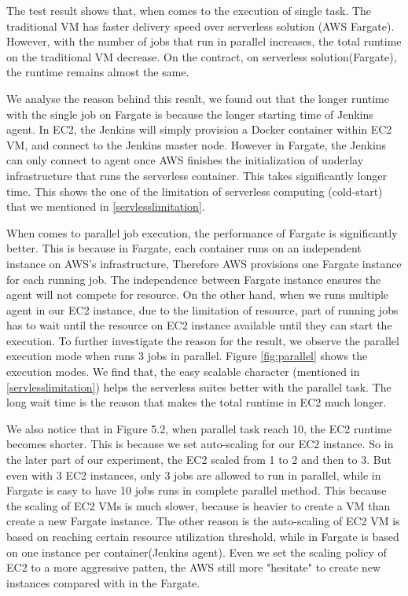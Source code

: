 \par
The test result shows that, when comes to the execution of single task. The traditional VM has faster delivery speed over serverless solution (AWS Fargate). However, with the number of jobs that run in parallel increases, the total runtime on the traditional VM decrease. On the contract, on serverless solution(Fargate), the runtime remains almost the same.
\par
We analyse the reason behind this result, we found out that the longer runtime with the single job on Fargate is because the longer starting time of Jenkins agent. In EC2, the Jenkins will simply provision a Docker container within EC2 VM, and connect to the Jenkins master node. However in Fargate, the Jenkins can only connect to agent once AWS finishes the initialization of underlay infrastructure that runs the serverless container. This takes significantly longer time. This shows the one of the limitation of serverless computing (cold-start) that we mentioned in \ref{servlesslimitation}.

\par
When comes to parallel job execution, the performance of Fargate is significantly better. This is because in Fargate, each container runs on an independent instance on AWS's infrastructure, Therefore AWS provisions one Fargate instance for each running job. The independence between Fargate instance ensures the agent will not compete for resource. On the other hand, when we runs multiple agent in our EC2 instance, due to the limitation of resource, part of running jobs has to wait until the resource on EC2 instance available until they can start the execution. To further investigate the reason for the result, we observe the parallel execution mode when runs 3 jobs in parallel. Figure \ref{fig:parallel} shows the execution modes. We find that, the easy scalable character (mentioned in \ref{servlesslimitation}) helps the serverless suites better with the parallel task. The long wait time is the reason that makes the total runtime in EC2 much longer. 
\par
We also notice that in Figure 5.2, when parallel task reach 10, the EC2 runtime becomes shorter. This is because we set auto-scaling for our EC2 instance. So in the later part of our experiment, the EC2 scaled from 1 to 2 and then to 3. But even with 3 EC2 instances, only 3 jobs are allowed to run in parallel, while in Fargate is easy to have 10 jobs runs in complete parallel method. This because the scaling of EC2 VMs is much slower, because is heavier to create a VM than create a new Fargate instance. The other reason is the auto-scaling of EC2 VM is based on reaching certain resource utilization threshold, while in Fargate is based on one instance per container(Jenkins agent). Even we set the scaling policy of EC2 to a more aggressive patten, the AWS still more "hesitate" to create new instances compared with in the Fargate.
